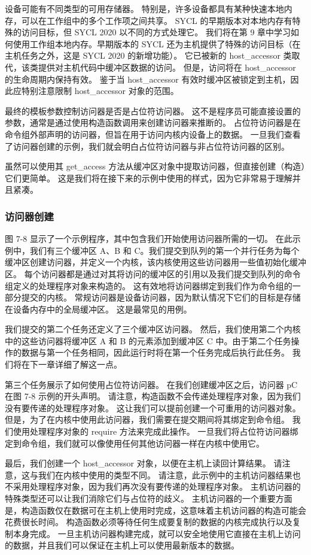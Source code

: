 设备可能有不同类型的可用存储器。 特别是，许多设备都具有某种快速本地内存，可以在工作组中的多个工作项之间共享。 SYCL 的早期版本对本地内存有特殊的访问目标，但 SYCL 2020 以不同的方式处理它。 我们将在第 9 章中学习如何使用工作组本地内存。早期版本的 SYCL 还为主机提供了特殊的访问目标（在主机任务之外，这是 SYCL 2020 的新增功能）。 它已被新的 host\_accessor 类取代，该类提供对主机代码中缓冲区数据的访问。 但是，访问将在 host\_accessor 的生命周期内保持有效。 鉴于当 host\_accessor 有效时缓冲区被锁定到主机，因此应特别注意限制 host\_accessor 对象的范围。

最终的模板参数控制访问器是否是占位符访问器。 这不是程序员可能直接设置的参数，通常是通过使用构造函数调用来创建访问器来推断的。 占位符访问器是在命令组外部声明的访问器，但旨在用于访问内核内设备上的数据。 一旦我们查看了访问器创建的示例，我们就会明白占位符访问器与非占位符访问器的区别。

虽然可以使用其 get\_access 方法从缓冲区对象中提取访问器，但直接创建（构造）它们更简单。 这是我们将在接下来的示例中使用的样式，因为它非常易于理解并且紧凑。

\subsubsection{访问器创建}
图 7-8 显示了一个示例程序，其中包含我们开始使用访问器所需的一切。 在此示例中，我们有三个缓冲区 A、B 和 C。我们提交到队列的第一个并行任务为每个缓冲区创建访问器，并定义一个内核，该内核使用这些访问器用一些值初始化缓冲区。 每个访问器都是通过对其将访问的缓冲区的引用以及我们提交到队列的命令组定义的处理程序对象来构造的。 这有效地将访问器绑定到我们作为命令组的一部分提交的内核。 常规访问器是设备访问器，因为默认情况下它们的目标是存储在设备内存中的全局缓冲区。 这是最常见的用例。

我们提交的第二个任务还定义了三个缓冲区访问器。 然后，我们使用第二个内核中的这些访问器将缓冲区 A 和 B 的元素添加到缓冲区 C 中。由于第二个任务操作的数据与第一个任务相同，因此运行时将在第一个任务完成后执行此任务。 我们将在下一章详细了解这一点。

第三个任务展示了如何使用占位符访问器。 在我们创建缓冲区之后，访问器 pC 在图 7-8 示例的开头声明。 请注意，构造函数不会传递处理程序对象，因为我们没有要传递的处理程序对象。 这让我们可以提前创建一个可重用的访问器对象。 但是，为了在内核中使用此访问器，我们需要在提交期间将其绑定到命令组。 我们使用处理程序对象的 require 方法来完成此操作。 一旦我们将占位符访问器绑定到命令组，我们就可以像使用任何其他访问器一样在内核中使用它。

最后，我们创建一个 host\_accessor 对象，以便在主机上读回计算结果。 请注意，这与我们在内核中使用的类型不同。 请注意，此示例中的主机访问器结果也不采用处理程序对象，因为我们再次没有要传递的处理程序对象。 主机访问器的特殊类型还可以让我们消除它们与占位符的歧义。 主机访问器的一个重要方面是，构造函数仅在数据可在主机上使用时完成，这意味着主机访问器的构造可能会花费很长时间。 构造函数必须等待任何生成要复制的数据的内核完成执行以及复制本身完成。 一旦主机访问器构建完成，就可以安全地使用它直接在主机上访问的数据，并且我们可以保证在主机上可以使用最新版本的数据。

